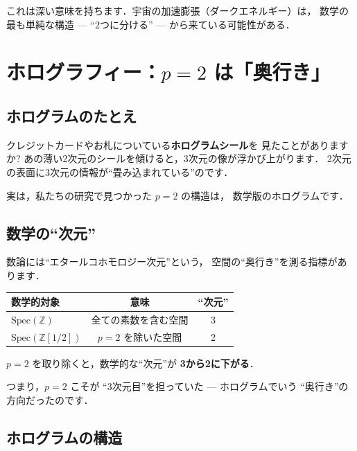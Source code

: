 \documentclass[11pt,a4paper]{article}
\begin{document}
これは深い意味を持ちます．宇宙の加速膨張（ダークエネルギー）は，
数学の最も単純な構造 --- ``2つに分ける'' --- から来ている可能性がある．

\section{ホログラフィー：$p = 2$ は「奥行き」}

\subsection{ホログラムのたとえ}

クレジットカードやお札についている\textbf{ホログラムシール}を
見たことがありますか?
あの薄い2次元のシールを傾けると，3次元の像が浮かび上がります．
2次元の表面に3次元の情報が``畳み込まれている''のです．

実は，私たちの研究で見つかった $p = 2$ の構造は，
数学版のホログラムです．

\subsection{数学の``次元''}

数論には``エタールコホモロジー次元''という，
空間の``奥行き''を測る指標があります．

\begin{center}
\begin{tabular}{lcc}
\toprule
数学的対象 & 意味 & ``次元'' \\
\midrule
$\mathrm{Spec}(\mathbb{Z})$ & 全ての素数を含む空間 & 3 \\
$\mathrm{Spec}(\mathbb{Z}[1/2])$ & $p=2$ を除いた空間 & 2 \\
\bottomrule
\end{tabular}
\end{center}

\begin{tcolorbox}[colback=purple!5,colframe=purple!50!black,title=ポイント]
$p=2$ を取り除くと，数学的な``次元''が \textbf{3から2に下がる}．

つまり，$p=2$ こそが ``3次元目''を担っていた --- ホログラムでいう
``奥行き''の方向だったのです．
\end{tcolorbox}

\subsection{ホログラムの構造}
\end{document}
